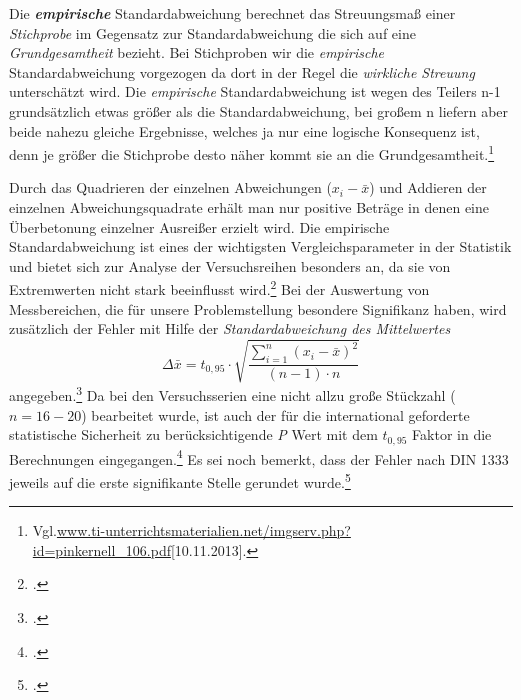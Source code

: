 \documentclass[12pt,a4paper,parskip]{scrartcl}
\begin{document}
Die \textbf{\emph{empirische}} Standardabweichung berechnet das Streuungsmaß einer \emph{Stichprobe} im Gegensatz zur Standardabweichung die sich auf eine \emph{Grundgesamtheit} bezieht. Bei Stichproben wir die \emph{empirische} Standardabweichung vorgezogen da dort in der Regel die \emph{wirkliche Streuung} unterschätzt wird. Die \emph{empirische} Standardabweichung ist wegen des Teilers n-1 grundsätzlich etwas größer als die Standardabweichung, bei großem n liefern aber beide nahezu gleiche Ergebnisse, welches ja nur eine logische Konsequenz ist, denn je größer die Stichprobe desto näher kommt sie an die Grundgesamtheit.\footnote{Vgl.\url{www.ti-unterrichtsmaterialien.net/imgserv.php?id=pinkernell_106.pdf}[10.11.2013].‎}

\medskip

Durch das Quadrieren der einzelnen Abweichungen ($ x_i-\bar{x}$) und Addieren der einzelnen Abweichungsquadrate erhält man nur positive Beträge in denen eine Überbetonung einzelner Ausreißer erzielt wird.
Die empirische Standardabweichung ist   eines der wichtigsten Vergleichsparameter in der Statistik und bietet sich zur Analyse der Versuchsreihen besonders an, da sie von Extremwerten nicht stark beeinflusst wird.\footcite[Vgl.][54]{gst} Bei der Auswertung von Messbereichen, die für unsere Problemstellung besondere Signifikanz haben, wird zusätzlich der Fehler mit Hilfe der  \emph{Standardabweichung des Mittelwertes}  \begin{equation} \Delta\bar{x}= t_{0,95} \cdot \sqrt{\frac{\sum \limits_{i=1}^n (x_i - \bar{x})^2}{(n-1)\cdot n}}\end{equation}  angegeben.\footcite[Vgl.][16]{ph} Da bei den Versuchsserien eine nicht allzu große Stückzahl ($ n=16-20 $) bearbeitet wurde,  ist auch der für die international geforderte statistische Sicherheit zu berücksichtigende \emph{P} Wert mit dem $ t_{0,95} $ Faktor in die Berechnungen eingegangen.\footcite[Vgl.][609]{tp}  Es sei noch bemerkt, dass der Fehler nach DIN 1333 jeweils auf die erste signifikante Stelle gerundet wurde.\footcite[Vgl.][612]{tp}
 	 	
 	

 	
\end{document}
